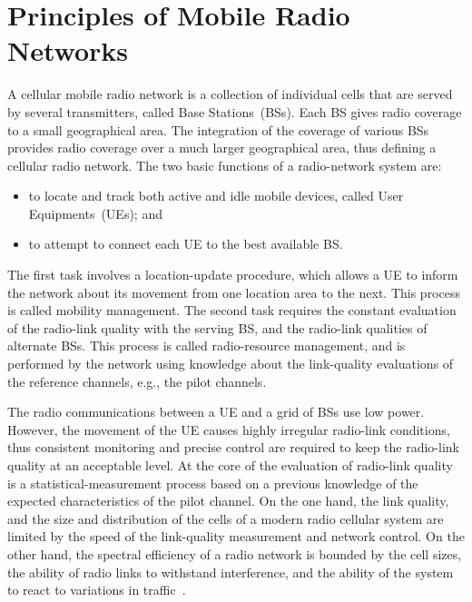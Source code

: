 \chapter{Principles of Mobile Radio Networks \label{chap:02-Principles_of_mobile_radio_networks}}

A cellular mobile radio network is a collection of individual cells
that are served by several transmitters, called Base Stations~(BSs).
Each BS gives radio coverage to a small geographical area. The integration
of the coverage of various BSs provides radio coverage over a much
larger geographical area, thus defining a cellular radio network.
The two basic functions of a radio-network system are: 
\begin{itemize}
\item to locate and track both active and idle mobile devices, called User
Equipments~(UEs); and
\item to attempt to connect each UE to the best available BS.
\end{itemize}
The first task involves a location-update procedure, which allows
a UE to inform the network about its movement from one location area
to the next. This process is called mobility management. The second
task requires the constant evaluation of the radio-link quality with
the serving BS, and the radio-link qualities of alternate BSs. This
process is called radio-resource management, and is performed by the
network using knowledge about the link-quality evaluations of the
reference channels, e.g., the pilot channels.

The radio communications between a UE and a grid of BSs use low power.
However, the movement of the UE causes highly irregular radio-link
conditions, thus consistent monitoring and precise control are required
to keep the radio-link quality at an acceptable level. At the core
of the evaluation of radio-link quality is a statistical-measurement
process based on a previous knowledge of the expected characteristics
of the pilot channel. On the one hand, the link quality, and the size
and distribution of the cells of a modern radio cellular system are
limited by the speed of the link-quality measurement and network control.
On the other hand, the spectral efficiency of a radio network is bounded
by the cell sizes, the ability of radio links to withstand interference,
and the ability of the system to react to variations in traffic~\cite{Stuber-Principles_of_mobile_communication:2011}.

